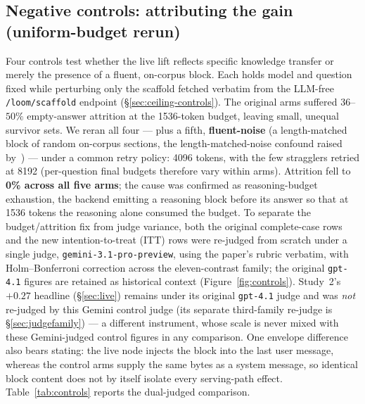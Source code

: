 \documentclass[10pt,twocolumn]{article}
\begin{document}
\subsection{Negative controls: attributing the gain (uniform-budget rerun)}\label{sec:controls}
Four controls test whether the live lift reflects specific knowledge transfer or merely the presence of a fluent, on-corpus block. Each holds model and question fixed while perturbing only the scaffold fetched verbatim from the LLM-free \texttt{/loom/scaffold} endpoint (\S\ref{sec:ceiling-controls}). The original arms suffered $36$--$50\%$ empty-answer attrition at the 1536-token budget, leaving small, unequal survivor sets. We reran all four --- plus a fifth, \textbf{fluent-noise} (a length-matched block of random on-corpus sections, the length-matched-noise confound raised by~\textcite{cuconasu2024poweofnoise}) --- under a common retry policy: 4096 tokens, with the few stragglers retried at 8192 (per-question final budgets therefore vary within arms). Attrition fell to \textbf{0\% across all five arms}; the cause was confirmed as reasoning-budget exhaustion, the backend emitting a reasoning block before its answer so that at 1536 tokens the reasoning alone consumed the budget. To separate the budget/attrition fix from judge variance, both the original complete-case rows and the new intention-to-treat (ITT) rows were re-judged from scratch under a single judge, \texttt{gemini-3.1-pro-preview}, using the paper's rubric verbatim, with Holm--Bonferroni correction across the eleven-contrast family; the original \texttt{gpt-4.1} figures are retained as historical context (Figure~\ref{fig:controls}). Study~2's $+0.27$ headline (\S\ref{sec:live}) remains under its original \texttt{gpt-4.1} judge and was \emph{not} re-judged by this Gemini control judge (its separate third-family re-judge is \S\ref{sec:judgefamily}) --- a different instrument, whose scale is never mixed with these Gemini-judged control figures in any comparison. One envelope difference also bears stating: the live node injects the block into the last user message, whereas the control arms supply the same bytes as a system message, so identical block content does not by itself isolate every serving-path effect. Table~\ref{tab:controls} reports the dual-judged comparison.


\end{document}
